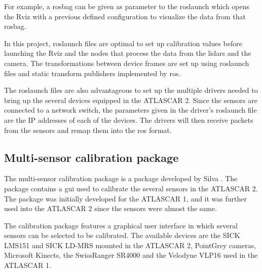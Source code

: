 For example, a rosbag can be given as parameter to the roslaunch which opens the Rviz with a previous defined configuration to visualize the data from that rosbag.

In this project, roslaunch files are optimal to set up calibration values before launching the Rviz and the nodes that process the data from the \gls{lidar}s and the camera. The transformations between device frames are set up using roslaunch files and static transform publishers implemented by \gls{ros}. 

The roslaunch files are also advantageous to set up the multiple drivers needed to bring up the several devices equipped in the ATLASCAR 2. Since the sensors are connected to a network switch, the parameters given in the driver's roslaunch file are the IP addresses of each of the devices. The drivers will then receive packets from the sensors and remap them into the \gls{ros} format.



\subsection{Multi-sensor calibration package}

The multi-sensor calibration package is a package developed by Silva \cite{VieiradaSilva2016}. The package contains a \gls{gui} used to calibrate the several sensors in the ATLASCAR 2. The package was initially developed for the ATLASCAR 1, and it was further used into the ATLASCAR 2 since the sensors were almost the same.

The calibration package features a graphical user interface in which several sensors can be selected to be calibrated. The available devices are the SICK LMS151 and SICK LD-MRS mounted in the ATLASCAR 2, PointGrey cameras, Microsoft Kinects, the SwissRanger SR4000 and the Velodyne VLP16 used in the ATLASCAR 1.



